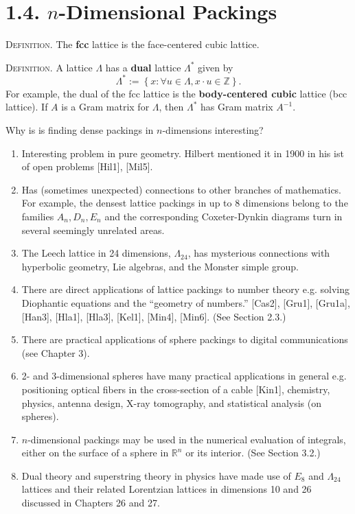 \documentclass{article}
\newcommand{\Z}{\mathbb{Z}}
\newcommand{\R}{\mathbb{R}}
\renewcommand{\i}{^{-1}}
\newcommand{\set}[1]{\left\{ #1 \right\}}
\newcommand{\Leech}{\Lambda_{24}}
\newcommand{\header}[1]{\noindent\textsc{#1.} }
\begin{document}
\section*{1.4. $n$-Dimensional Packings}

\header{Definition}
The \textbf{fcc} lattice is the face-centered cubic lattice.

\header{Definition}
A lattice $\Lambda$ has a \textbf{dual} lattice $\Lambda^*$ given by
$$ \Lambda^* := \set{ x : \forall u \in \Lambda, x \cdot u \in \Z }. $$
For example, the dual of the fcc lattice is the \textbf{body-centered cubic} lattice (bcc lattice).
If $A$ is a Gram matrix for $\Lambda$, then $\Lambda^*$ has Gram matrix $A\i$.

Why is is finding dense packings in $n$-dimensions interesting?
\begin{enumerate}
  \item
  Interesting problem in pure geometry.
  Hilbert mentioned it in 1900 in his ist of open problems [Hil1], [Mil5].

  \item
  Has (sometimes unexpected) connections to other branches of mathematics.
  For example, the densest lattice packings in up to 8 dimensions belong to the families $A_n, D_n, E_n$ and the corresponding Coxeter-Dynkin diagrams turn in several seemingly unrelated areas.

  \item
  The Leech lattice in 24 dimensions, $\Leech$, has mysterious connections with hyperbolic geometry, Lie algebras, and the Monster simple group.

  \item
  There are direct applications of lattice packings to number theory e.g. solving Diophantic equations and the ``geometry of numbers.'' [Cas2], [Gru1], [Gru1a], [Han3], [Hla1], [Hla3], [Kel1], [Min4], [Min6].
  (See Section 2.3.)

  \item
  There are practical applications of sphere packings to digital communications (see Chapter 3).

  \item
  2- and 3-dimensional spheres have many practical applications in general e.g. positioning optical fibers in the cross-section of a cable [Kin1], chemistry, physics, antenna design, X-ray tomography, and statistical analysis (on spheres).

  \item
  $n$-dimensional packings may be used in the numerical evaluation of integrals, either on the surface of a sphere in $\R^n$ or its interior. (See Section 3.2.)

  \item
  Dual theory and superstring theory in physics have made use of $E_8$ and $\Leech$ lattices and their related Lorentzian lattices in dimensions 10 and 26 discussed in Chapters 26 and 27.

\end{enumerate}
\end{document}
